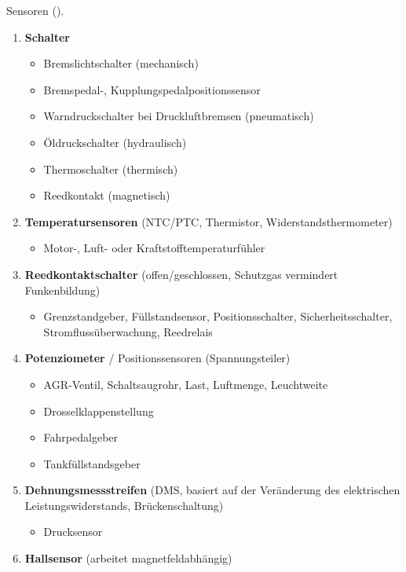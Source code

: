 Sensoren (\textcite{respondeck:2019:servicetechniker}).

\begin{enumerate}
\item
  \textbf{Schalter}

  \begin{itemize}
  \item
    Bremslichtschalter (mechanisch)
  \item
    Bremspedal-, Kupplungspedalpositionssensor
  \item
    Warndruckschalter bei Druckluftbremsen (pneumatisch)
  \item
    Öldruckschalter (hydraulisch)
  \item
    Thermoschalter (thermisch)
  \item
    Reedkontakt (magnetisch)
  \end{itemize}
\item
  \textbf{Temperatursensoren} (NTC/PTC, Thermistor,
  Widerstandsthermometer)

  \begin{itemize}
  \item
    Motor-, Luft- oder Kraftstofftemperaturfühler
  \end{itemize}
\item
  \textbf{Reedkontaktschalter} (offen/geschlossen, Schutzgas vermindert
  Funkenbildung)

  \begin{itemize}
  \item
    Grenzstandgeber, Füllstandsensor, Positionsschalter,
    Sicherheitsschalter, Stromflussüberwachung, Reedrelais
  \end{itemize}
\item
  \textbf{Potenziometer} / Positionssensoren (Spannungsteiler)

  \begin{itemize}
  \item
    AGR-Ventil, Schaltsaugrohr, Last, Luftmenge, Leuchtweite
  \item
    Drosselklappenstellung
  \item
    Fahrpedalgeber
  \item
    Tankfüllstandsgeber
  \end{itemize}
\item
  \textbf{Dehnungsmessstreifen} (DMS, basiert auf der Veränderung des
  elektrischen Leistungswiderstands, Brückenschaltung)

  \begin{itemize}
  \item
    Drucksensor
  \end{itemize}
\item
  \textbf{Hallsensor} (arbeitet magnetfeldabhängig)


\end{enumerate}
